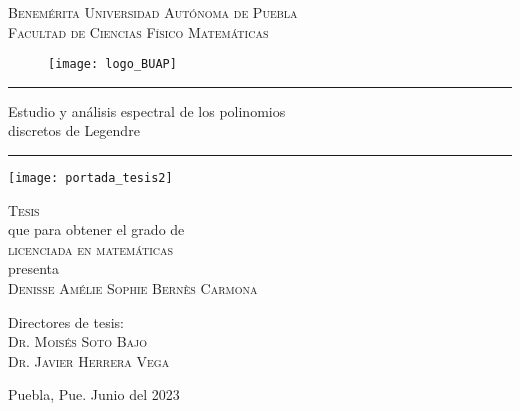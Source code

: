 
\thispagestyle{empty} %

\begin{center}
{\Large{
\textsc{Benemérita Universidad Autónoma de Puebla}
}} \\
\vspace{0.5cm}
{\Large{
\textsc{Facultad de Ciencias Físico Matemáticas}
}}
\end{center}


\begin{figure}[H]
	\centering
	\texttt{[image: logo\_BUAP]} 
\end{figure}	



\hrule
\vspace{0.5cm}
\begin{center}
{\Large {Estudio y análisis espectral de los polinomios \\
discretos de Legendre}}
\end{center}
\vspace{0.5cm}
\hrule


\begin{marginfigure}
\texttt{[image: portada\_tesis2]} 
\end{marginfigure}






\vspace{4cm}

\noindent
\textsc{Tesis} \\
que para obtener el grado de \\
\textsc{licenciada en matemáticas} \\
presenta \\
\textsc{Denisse Amélie Sophie Bernès Carmona}



\vspace{2cm}

\noindent
Directores de tesis: \\
\textsc{Dr. Moisés Soto Bajo} \\
\textsc{Dr. Javier Herrera Vega} 




\vspace*{\fill}
Puebla, Pue. Junio del 2023 









\newpage
